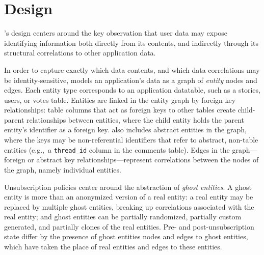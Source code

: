 \section{Design}


\sys's design centers around the key observation that user data may expose identifying information
both directly from its contents, and indirectly through its structural correlations to other
application data. 



In order to capture exactly which data contents, and which data correlations may be
identity-sensitive, \sys models an application's data as a graph of \emph{entity} nodes and edges.
Each entity type corresponds to an application datatable, such as a stories, users, or votes table.
Entities are linked in the entity graph by foreign key relationships: table columns that act as
foreign keys to other tables create child-parent relationships between entities, where the child
entity holds the parent entity's identifier as a foreign key. \sys also includes
abstract entities in the graph, where the keys may be non-referential identifiers that refer to
abstract, non-table entities (e.g.,\ a \texttt{thread\_id} column in the comments table).  Edges in
the graph---foreign or abstract key relationships---represent correlations between the nodes of the
graph, namely individual entities.

Unsubscription policies center around the abstraction of \emph{ghost entities}. A ghost entity is
more than an anonymized version of a real entity: a real entity may be replaced by multiple ghost
entities, breaking up correlations associated with the real entity; and ghost entities can be partially
randomized, partially custom generated, and partially clones of the real entities. 
Pre- and post-unsubscription state differ by the presence of ghost entities nodes and edges to ghost
entities, which have taken the place of real entities and edges to these entities.

